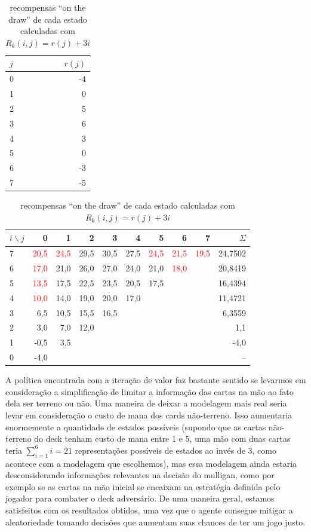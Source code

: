 \begin{table}[!h]
\parbox{.25\linewidth}{
\centering
\vspace{0.2cm}
\begin{tabular}{l|r}
$j$  & $r(j)$ \\ \hline
0 & -4  \\
1 & 0     \\
2 & 5      \\
3 & 6      \\
4 & 3     \\
5 & 0    \\
6 & -3     \\
7 & -5
\end{tabular}
\caption{recompensas-base para $j = 0, \ldots, 7$ }
\label{tab:rjdraw}
}
\hfill
\parbox{.70\linewidth}{
\centering
\begin{tabular}{l|rrrrrrrr|r}
$i \backslash j$ & 0     & 1  & 2  & 3  & 4  & 5  & 6  & 7  & $\Sigma$ \\ \hline
7 & \textcolor{red}{20,5} & \textcolor{red}{24,5} & 29,5 & 30,5 & 27,5 & \textcolor{red}{24,5} & \textcolor{red}{21,5} & \textcolor{red}{19,5} & 24,7502 \\
6 & \textcolor{red}{17,0} & 21,0 & 26,0 & 27,0 & 24,0 & 21,0 & \textcolor{red}{18,0} && 20,8419 \\
5 & \textcolor{red}{13,5} & 17,5 & 22,5 & 23,5 & 20,5 & 17,5 &&& 16,4394 \\
4 & \textcolor{red}{10,0} & 14,0 & 19,0 & 20,0 & 17,0 &&&& 11,4721 \\
3 & 6,5 & 10,5 & 15,5 & 16,5 &&&&& 6,3559 \\
2 & 3,0 & 7,0 & 12,0 &&&&&& 1,1 \\
1 & -0,5 & 3,5 &&&&&&& -4,0 \\
0 & -4,0 &&&&&&&& --
\end{tabular}
\caption{recompensas ``on the draw'' de cada estado calculadas com $R_k(i,j) = r(j) + 3i$}
\label{tab:Rijdraw}
}
\end{table}

A política encontrada com a iteração de valor faz bastante sentido se levarmos em consideração a simplificação de limitar a informação das cartas na mão ao fato dela ser terreno ou não. Uma maneira de deixar a modelagem mais real seria levar em consideração o custo de mana dos cards não-terreno. Isso aumentaria enormemente a quantidade de estados possíveis (supondo que as cartas não-terreno do deck tenham custo de mana entre 1 e 5, uma mão com duas cartas teria $\sum\limits_{i=1}^{6}i = 21$ representações possíveis de estados ao invés de 3, como acontece com a modelagem que escolhemos), mas essa modelagem ainda estaria desconsiderando informações relevantes na decisão do mulligan, como por exemplo se as cartas na mão inicial se encaixam na estratégia definida pelo jogador para combater o deck adversário. De uma maneira geral, estamos satisfeitos com os resultados obtidos, uma vez que o agente consegue mitigar a aleatoriedade tomando decisões que aumentam suas chances de ter um jogo justo.

